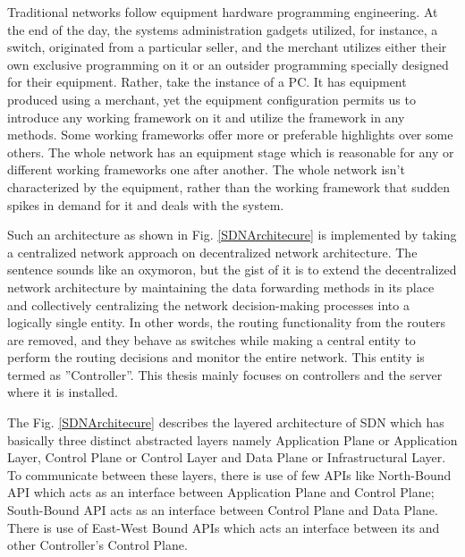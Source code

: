     Traditional networks follow equipment hardware programming engineering. At the end of the day, the systems administration gadgets utilized, for instance, a switch, originated from a particular seller, and the merchant utilizes either their own exclusive programming on it or an outsider programming specially designed for their equipment. Rather, take the instance of a PC. It has equipment produced using a merchant, yet the equipment configuration permits us to introduce any working framework on it and utilize the framework in any methods. Some working frameworks offer more or preferable highlights over some others.
     The whole network has an equipment stage which is reasonable for any or different working frameworks one after another. The whole network isn't characterized by the equipment, rather than the working framework that sudden spikes in demand for it and deals with the system.
    
    Such an architecture as shown in Fig. \ref{SDNArchitecure} is implemented by taking a centralized network approach on decentralized network architecture. The sentence sounds like an oxymoron, but the gist of it is to extend the decentralized network architecture by maintaining the data forwarding methods in its place and collectively centralizing the network decision-making processes into a logically single entity. In other words, the routing functionality from the routers are removed, and they behave as switches while making a central entity to perform the routing decisions and monitor the entire network. This entity is termed as ''Controller''. This thesis mainly focuses on controllers and the server where it is installed.
    
    The Fig. \ref{SDNArchitecure} describes the layered architecture of SDN which has basically three distinct abstracted layers namely Application Plane or Application Layer, Control Plane or Control Layer and Data Plane or Infrastructural Layer. To communicate between these layers, there is use of few APIs like North-Bound API which acts as an interface between Application Plane and Control Plane; South-Bound API acts as an interface between Control Plane and Data Plane. There is use of East-West Bound APIs which acts an interface between its and other Controller's Control Plane.
    
